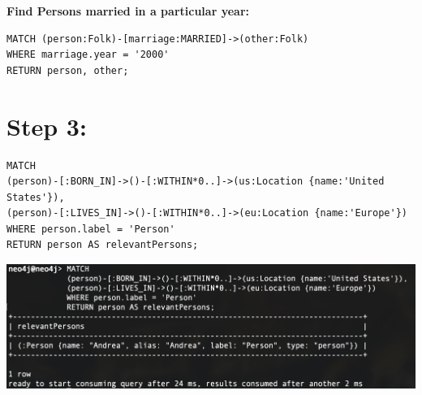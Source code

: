 \documentclass[14pt,a4paper]{extarticle}
\begin{document}
	\noindent \textbf{Find Persons married in a particular year:}
	\begin{lstlisting}[style=sql]
MATCH (person:Folk)-[marriage:MARRIED]->(other:Folk)
WHERE marriage.year = '2000'
RETURN person, other;
	\end{lstlisting}



	



	\section*{Step 3:}
	\begin{lstlisting}[style=sql]
MATCH
(person)-[:BORN_IN]->()-[:WITHIN*0..]->(us:Location {name:'United States'}),
(person)-[:LIVES_IN]->()-[:WITHIN*0..]->(eu:Location {name:'Europe'})
WHERE person.label = 'Person'
RETURN person AS relevantPersons;
	\end{lstlisting}
	\includegraphics[width=\textwidth]{images/sc-step3.png}
\end{document}
